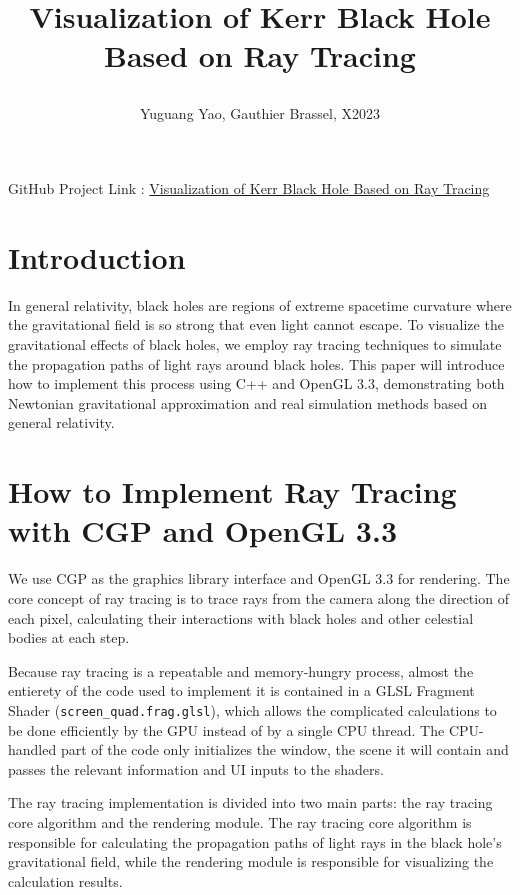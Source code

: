 \documentclass[11pt,a4paper]{article}
\title{Visualization of Kerr Black Hole Based on Ray Tracing
    \begin{large} 
    \text{A Programming Project for CSC-43043-EP : Graphic Computing}
    \end{large} }
\author{Yuguang Yao, Gauthier Brassel, X2023}
\date{}
\begin{document}
\maketitle

GitHub Project Link : \href{https://github.com/luc6987/Visualization-of-Kerr-Blackhole-with-raychacing} {Visualization of Kerr Black Hole Based on Ray Tracing}

\section{Introduction}

In general relativity, black holes are regions of extreme spacetime curvature where the gravitational field is so strong that even light cannot escape. To visualize the gravitational effects of black holes, we employ ray tracing techniques to simulate the propagation paths of light rays around black holes. This paper will introduce how to implement this process using C++ and OpenGL 3.3, demonstrating both Newtonian gravitational approximation and real simulation methods based on general relativity.

\section{How to Implement Ray Tracing with CGP and OpenGL 3.3}

We use CGP as the graphics library interface and OpenGL 3.3 for rendering. The core concept of ray tracing is to trace rays from the camera along the direction of each pixel, calculating their interactions with black holes and other celestial bodies at each step.

Because ray tracing is a repeatable and memory-hungry process, almost the entierety of the code used to implement it is contained in a GLSL Fragment Shader (\texttt{screen\_quad.frag.glsl}), which allows the complicated calculations to be done efficiently by the GPU instead of by a single CPU thread. The CPU-handled part of the code only initializes the window, the scene it will contain and passes the relevant information and UI inputs to the shaders.

The ray tracing implementation is divided into two main parts: the ray tracing core algorithm and the rendering module. The ray tracing core algorithm is responsible for calculating the propagation paths of light rays in the black hole's gravitational field, while the rendering module is responsible for visualizing the calculation results.
\end{document}
